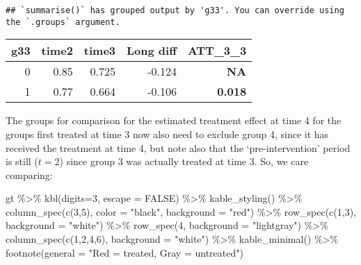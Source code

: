 \documentclass[
]{article}
\newenvironment{Shaded}{\begin{snugshade}}{\end{snugshade}}
\newcommand{\AttributeTok}[1]{\textcolor[rgb]{0.77,0.63,0.00}{#1}}
\newcommand{\ConstantTok}[1]{\textcolor[rgb]{0.00,0.00,0.00}{#1}}
\newcommand{\DecValTok}[1]{\textcolor[rgb]{0.00,0.00,0.81}{#1}}
\newcommand{\FunctionTok}[1]{\textcolor[rgb]{0.00,0.00,0.00}{#1}}
\newcommand{\NormalTok}[1]{#1}
\newcommand{\SpecialCharTok}[1]{\textcolor[rgb]{0.00,0.00,0.00}{#1}}
\newcommand{\StringTok}[1]{\textcolor[rgb]{0.31,0.60,0.02}{#1}}
\begin{document}
\begin{verbatim}
## `summarise()` has grouped output by 'g33'. You can override using the `.groups` argument.
\end{verbatim}

\begin{table}
\centering
\begin{tabular}{r|r|r|r|>{}r}
\hline
g33 & time2 & time3 & Long diff & ATT\_3\_3\\
\hline
0 & 0.85 & 0.725 & -0.124 & \textbf{NA}\\
\hline
1 & 0.77 & 0.664 & -0.106 & \textbf{0.018}\\
\hline
\end{tabular}
\end{table}

The groups for comparison for the estimated treatment effect at time 4
for the groups first treated at time 3 now also need to exclude group 4,
since it has received the treatment at time 4, but note also that the
`pre-intervention' period is still (\(t=2\)) since group 3 was actually
treated at time 3. So, we care comparing:

\begin{Shaded}
\begin{Highlighting}[]
\NormalTok{gt }\SpecialCharTok{\%\textgreater{}\%}
  \FunctionTok{kbl}\NormalTok{(}\AttributeTok{digits=}\DecValTok{3}\NormalTok{, }\AttributeTok{escape =} \ConstantTok{FALSE}\NormalTok{) }\SpecialCharTok{\%\textgreater{}\%}
  \FunctionTok{kable\_styling}\NormalTok{() }\SpecialCharTok{\%\textgreater{}\%}
  \FunctionTok{column\_spec}\NormalTok{(}\FunctionTok{c}\NormalTok{(}\DecValTok{3}\NormalTok{,}\DecValTok{5}\NormalTok{), }\AttributeTok{color =} \StringTok{"black"}\NormalTok{, }\AttributeTok{background =} \StringTok{"red"}\NormalTok{) }\SpecialCharTok{\%\textgreater{}\%}
  \FunctionTok{row\_spec}\NormalTok{(}\FunctionTok{c}\NormalTok{(}\DecValTok{1}\NormalTok{,}\DecValTok{3}\NormalTok{), }\AttributeTok{background =} \StringTok{"white"}\NormalTok{) }\SpecialCharTok{\%\textgreater{}\%}
  \FunctionTok{row\_spec}\NormalTok{(}\DecValTok{4}\NormalTok{, }\AttributeTok{background  =} \StringTok{"lightgray"}\NormalTok{) }\SpecialCharTok{\%\textgreater{}\%}
  \FunctionTok{column\_spec}\NormalTok{(}\FunctionTok{c}\NormalTok{(}\DecValTok{1}\NormalTok{,}\DecValTok{2}\NormalTok{,}\DecValTok{4}\NormalTok{,}\DecValTok{6}\NormalTok{), }\AttributeTok{background =} \StringTok{"white"}\NormalTok{) }\SpecialCharTok{\%\textgreater{}\%}
  \FunctionTok{kable\_minimal}\NormalTok{() }\SpecialCharTok{\%\textgreater{}\%}
  \FunctionTok{footnote}\NormalTok{(}\AttributeTok{general =} \StringTok{"Red = treated, Gray = untreated"}\NormalTok{)}
\end{Highlighting}
\end{Shaded}
\end{document}
